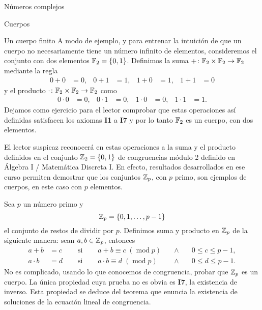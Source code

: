 \begin{chapter}{N\'umeros complejos}
\begin{section}{Cuerpos}
  \begin{subsection}{Un cuerpo finito}
      A modo de ejemplo, y para entrenar la intuición de que un cuerpo no necesariamente tiene un número infinito de elementos, consideremos el conjunto con dos elementos $\mathbb F_2=\{0,1\}$. Definimos la suma $+\colon\mathbb F_2\times \mathbb F_2\to \mathbb F_2$ mediante la regla
      \begin{align*}
          0+0 & =0, & 0+1 & =1, & 1+0 & =1, & 1+1 & =0
      \end{align*}
      y el producto $\cdot \colon\mathbb F_2\times \mathbb F_2\to \mathbb F_2$ como
      \begin{align*}
          0\cdot 0 & =0, & 0\cdot 1 & =0, & 1\cdot 0 & =0, & 1\cdot 1 & =1.
      \end{align*}
      Dejamos como ejercicio para el lector comprobar que estas operaciones así definidas satisfacen los axiomas \textbf{I1} a \textbf{I7} y por lo tanto $\mathbb F_2$ es un cuerpo, con dos elementos.

      \begin{observacion*}
          El lector suspicaz reconocerá en estas operaciones a la suma y el producto definidos en el conjunto $\mathbb Z_2=\{0,1\}$ de congruencias módulo 2  definido en Álgebra I / Matemática Discreta I. En efecto, resultados desarrollados en ese curso permiten demostrar que los conjuntos $\mathbb Z_p$, con $p$ primo, son ejemplos de cuerpos, en este caso con $p$ elementos.
      \end{observacion*}

      \begin{ejemplo*}
          Sea $p$ un número primo y
          $$
              \mathbb Z_p = \{0,1,\ldots, p-1\}
          $$
          el conjunto de restos de dividir por $p$. Definimos suma y producto en $\mathbb Z_p$ de la siguiente manera: sean $a,b \in \mathbb Z_p$,  entonces
          \begin{equation*}
              \begin{array}{llllll}
                  a+b       & = c\quad & \text{ si }\quad & a+b \equiv c \; (\operatorname{mod}p) \quad & \wedge\quad & 0 \le c \le p-1, \\
                  a \cdot b & = d\quad & \text{ si }\quad & a\cdot b \equiv d \; (\operatorname{mod}p)  & \wedge      & 0 \le d \le p-1.
              \end{array}
          \end{equation*}
          No es complicado, usando lo que conocemos de congruencia, probar que $\mathbb Z_p$  es un cuerpo. La única propiedad cuya prueba no es obvia es  \textbf{I7}, la existencia de inverso. Esta propiedad se deduce del teorema que enuncia la existencia de soluciones  de la ecuación lineal de congruencia.
      \end{ejemplo*}


\end{subsection}
\end{section}
\end{chapter}
